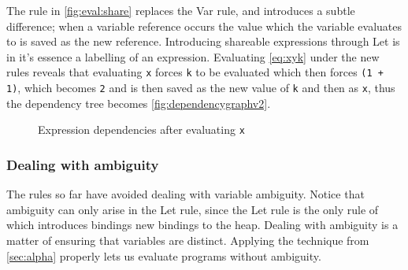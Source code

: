 \documentclass[11pt,oneside,a4paper]{report}
\begin{document}
The rule in \autoref{fig:eval:share} replaces the Var rule, and introduces a subtle difference; when a variable reference occurs the value which the variable evaluates to is saved as the new reference.
Introducing shareable expressions through Let is in it's essence a labelling of an expression.
Evaluating \autoref{eq:xyk} under the new rules reveals that evaluating \texttt{x} forces \texttt{k} to be evaluated which then forces \texttt{(1 + 1)}, which becomes \texttt{2} and is then saved as the new value of \texttt{k} and then as \texttt{x}, thus the dependency tree becomes \autoref{fig:dependencygraphv2}.
\begin{figure}[ht]
  \centering
  \caption{Expression dependencies after evaluating \texttt{x}}
  \label{fig:dependencygraphv2}
\end{figure}

\subsubsection{Dealing with ambiguity}
The rules so far have avoided dealing with variable ambiguity.
Notice that ambiguity can only arise in the Let rule, since the Let rule is the only rule of which introduces bindings new bindings to the heap.
Dealing with ambiguity is a matter of ensuring that variables are distinct.
Applying the technique from \autoref{sec:alpha} properly lets us evaluate programs without ambiguity.
\end{document}
